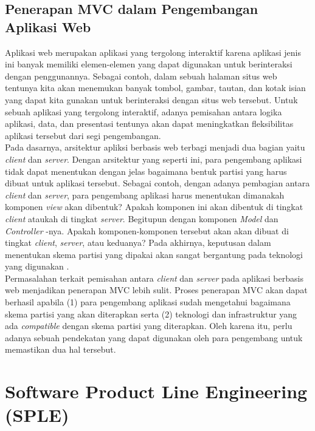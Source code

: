 \subsection{Penerapan MVC dalam Pengembangan Aplikasi Web}
Aplikasi web merupakan aplikasi yang tergolong interaktif karena aplikasi jenis ini banyak memiliki elemen-elemen yang dapat digunakan untuk berinteraksi dengan penggunannya. Sebagai contoh, dalam sebuah halaman situs web tentunya kita akan menemukan banyak tombol, gambar, tautan, dan kotak isian yang dapat kita gunakan untuk berinteraksi dengan situs web tersebut. Untuk sebuah aplikasi yang tergolong interaktif, adanya pemisahan antara logika aplikasi, data, dan presentasi tentunya akan dapat meningkatkan fleksibilitas aplikasi tersebut dari segi pengembangan. \\

Pada dasarnya, arsitektur apliksi berbasis web terbagi menjadi dua bagian yaitu \textit{client} dan \textit{server}. Dengan arsitektur yang seperti ini, para pengembang aplikasi tidak dapat menentukan dengan jelas bagaimana bentuk partisi yang harus dibuat untuk aplikasi tersebut. Sebagai contoh, dengan adanya pembagian antara \textit{client} dan \textit{server}, para pengembang aplikasi harus menentukan dimanakah komponen \textit{view} akan dibentuk? Apakah komponen ini akan dibentuk di tingkat \textit{client} ataukah di tingkat \textit{server}. Begitupun dengan komponen \textit{Model} dan \textit{Controller
}-nya. Apakah komponen-komponen tersebut akan akan dibuat di tingkat \textit{client}, \textit{server}, atau keduanya? Pada akhirnya, keputusan dalam menentukan skema partisi yang dipakai akan sangat bergantung pada teknologi yang digunakan \citep{leff2001web}. \\

Permasalahan terkait pemisahan antara \textit{client} dan \textit{server} pada aplikasi berbasis web menjadikan penerapan MVC lebih sulit. Proses penerapan MVC akan dapat berhasil apabila (1) para pengembang aplikasi sudah mengetahui bagaimana skema partisi yang akan diterapkan serta (2) teknologi dan infrastruktur yang ada \textit{compatible} dengan skema partisi yang diterapkan. Oleh karena itu, perlu adanya sebuah pendekatan yang dapat digunakan oleh para pengembang untuk memastikan dua hal tersebut.

\section{Software Product Line Engineering (SPLE)}

